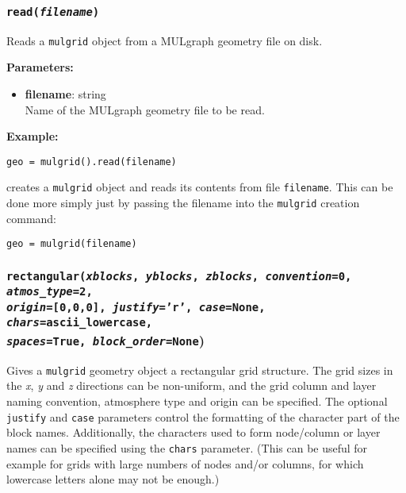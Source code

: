\begin{snugshade}\subsubsection{\texttt{read(\emph{filename})}}\end{snugshade}
\label{sec:mulgrid:read}

Reads a \texttt{mulgrid} object from a MULgraph geometry file on disk.

\textbf{Parameters:}
\begin{itemize}
\item \textbf{filename}: string\\
  Name of the MULgraph geometry file to be read.
\end{itemize}

\textbf{Example:}

\begin{lstlisting}
geo = mulgrid().read(filename)
\end{lstlisting}

creates a \texttt{mulgrid} object and reads its contents from file \texttt{filename}.  This can be done more simply just by passing the filename into the \texttt{mulgrid} creation command:

\begin{lstlisting}
geo = mulgrid(filename)
\end{lstlisting}

\begin{snugshade}
\subsubsection{\texttt{rectangular(\emph{xblocks}, \emph{yblocks}, \emph{zblocks}, \emph{convention}=0, \emph{atmos\_type}=2,\\
    \emph{origin}=[0,0,0], \emph{justify}='r', \emph{case}=None, \emph{chars}=ascii\_lowercase,\\
    \emph{spaces}=\texttt{True}, \emph{block\_order}=None})}\end{snugshade}
\label{sec:mulgrid:rectangular}

Gives a \texttt{mulgrid} geometry object a rectangular grid structure.  The grid sizes in the \emph{x}, \emph{y} and \emph{z} directions can be non-uniform, and the grid column and layer naming convention, atmosphere type and origin can be specified.  The optional \texttt{justify} and \texttt{case} parameters control the formatting of the character part of the block names.  Additionally, the characters used to form node/column or layer names can be specified using the \texttt{chars} parameter.  (This can be useful for example for grids with large numbers of nodes and/or columns, for which lowercase letters alone may not be enough.)

